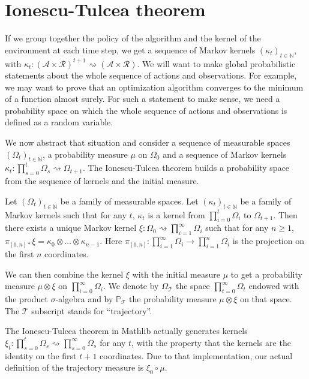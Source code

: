 \section{Ionescu-Tulcea theorem}

If we group together the policy of the algorithm and the kernel of the environment at each time step, we get a sequence of Markov kernels $(\kappa_t)_{t \in \mathbb{N}}$, with $\kappa_t : (\mathcal{A} \times \mathcal{R})^{t+1}  \rightsquigarrow (\mathcal{A} \times \mathcal{R})$.
We will want to make global probabilistic statements about the whole sequence of actions and observations.
For example, we may want to prove that an optimization algorithm converges to the minimum of a function almost surely.
For such a statement to make sense, we need a probability space on which the whole sequence of actions and observations is defined as a random variable.

We now abstract that situation and consider a sequence of measurable spaces $(\Omega_t)_{t \in \mathbb{N}}$, a probability measure $\mu$ on $\Omega_0$ and a sequence of Markov kernels $\kappa_t : \prod_{s=0}^t \Omega_s \rightsquigarrow \Omega_{t+1}$.
The Ionescu-Tulcea theorem builds a probability space from the sequence of kernels and the initial measure.

\begin{theorem}\label{thm:ionescu-tulcea}
  \mathlibok
Let $(\Omega_t)_{t \in \mathbb{N}}$ be a family of measurable spaces. Let $(\kappa_t)_{t \in \mathbb{N}}$ be a family of Markov kernels such that for any $t$, $\kappa_t$ is a kernel from $\prod_{i=0}^t \Omega_{i}$ to $\Omega_{t+1}$.
Then there exists a unique Markov kernel $\xi : \Omega_0 \rightsquigarrow \prod_{i = 1}^{\infty} \Omega_{i}$ such that for any $n \ge 1$,
$\pi_{[1,n]*} \xi = \kappa_0 \otimes \ldots \otimes \kappa_{n-1}$.
Here $\pi_{[1,n]} : \prod_{i=1}^{\infty} \Omega_i \to \prod_{i=1}^n \Omega_i$ is the projection on the first $n$ coordinates.
\end{theorem}

We can then combine the kernel $\xi$ with the initial measure $\mu$ to get a probability measure $\mu \otimes \xi$ on $\prod_{i=0}^{\infty} \Omega_i$.
We denote by $\Omega_{\mathcal{T}}$ the space $\prod_{t=0}^\infty \Omega_t$ endowed with the product $\sigma$-algebra and by $\mathbb{P}_{\mathcal{T}}$ the probability measure $\mu \otimes \xi$ on that space.
The $\mathcal{T}$ subscript stands for ``trajectory''.

The Ionescu-Tulcea theorem in Mathlib \cite{marion2025formalization} actually generates kernels $\xi_t : \prod_{s=0}^t \Omega_s \rightsquigarrow \prod_{s=0}^{\infty} \Omega_s$ for any $t$, with the property that the kernels are the identity on the first $t+1$ coordinates.
Due to that implementation, our actual definition of the trajectory measure is $\xi_0 \circ \mu$.


